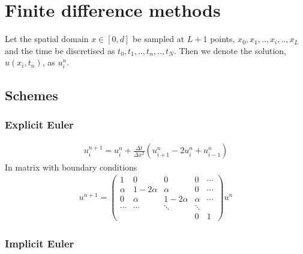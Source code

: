 \documentclass[11pt,a4paper,draft]{article}
\numberwithin{equation}{section}
\begin{document}


\section{Finite difference methods}

Let the spatial domain $x \in [0,d]$ be sampled at $L+1$ points, $x_0,x_1,..,x_i,..,x_L$ and the time be discretised as $t_0,t_1,..,t_n,..,t_N$. Then we denote the solution, $u(x_i,t_n)$, as $u_i^n$.  

\subsection{Schemes}

\subsubsection{Explicit Euler}

\begin{gather}
u_i^{n+1} = u_i^n + \frac{\Delta t}{\Delta x^2}\left(
u_{i+1}^n - 2u_i^n + u_{i-1}^n
\right)
\end{gather}
In matrix with boundary conditions
\begin{gather}
u^{n+1} = 
\begin{pmatrix}
1 & 0 & 0 & 0 & \cdots\\
\alpha & 1 - 2\alpha & \alpha & 0 & \cdots\\
0 & \alpha & 1-2\alpha & \alpha & \cdots\\
\cdots & \cdots & \ddots & \ddots& \\
&&& 0 & 1
\end{pmatrix}u^n
\end{gather}


\subsubsection{Implicit Euler}
\end{document}
